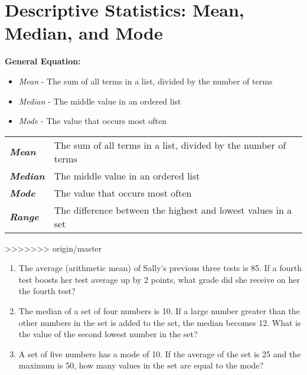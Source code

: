 \section{Descriptive Statistics: Mean, Median, and Mode}

\textbf{General Equation:}

\begin{itemize}[label=]
\item \textit{Mean} - The sum of all terms in a list, divided by the number of terms
\item \textit{Median} - The middle value in an ordered list
\item \textit{Mode} - The value that occurs most often
\end{itemize}

\begin{center}
\renewcommand{\arraystretch}{1.5}
\begin{tabular}{>{\itshape\bfseries}ll}
Mean & The sum of all terms in a list, divided by the number of terms\\
Median & The middle value in an ordered list\\
Mode & The value that occurs most often\\
Range & The difference between the highest and lowest values in a set
\end{tabular}
\end{center}
>>>>>>> origin/master

\begin{enumerate}[labelindent=*,style=multiline,leftmargin=*,label=\textbf{Example \arabic*:}]
\item The average (arithmetic mean) of Sally's previous three tests is 85. If a fourth test boosts her test average up by 2 points, what grade did she receive on her the fourth test?
\vfill\item The median of a set of four numbers is 10. If a large number greater than the other numbers in the set is added to the set, the median becomes 12. What is the value of the second lowest number in the set?
\vfill\item A set of five numbers has a mode of 10. If the average of the set is 25 and the maximum is 50, how many values in the set are equal to the mode?
\end{enumerate}

